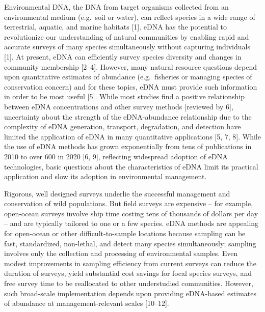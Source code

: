 \documentclass[
]{article}
\begin{document}
Environmental DNA, the DNA from target organisms collected from an
environmental medium (e.g.~soil or water), can reflect species in a wide
range of terrestrial, aquatic, and marine habitats {[}1{]}. eDNA has the
potential to revolutionize our understanding of natural communities by
enabling rapid and accurate surveys of many species simultaneously
without capturing individuals {[}1{]}. At present, eDNA can efficiently
survey species diversity and changes in community membership {[}2--4{]}.
However, many natural resource questions depend upon quantitative estimates
of abundance (e.g.~fisheries or managing species of conservation
concern) and for these topics, eDNA must provide such information
in order to be most useful {[}5{]}. While most studies find a
positive relationship between eDNA concentrations and other survey
methods {[}reviewed by 6{]}, uncertainty about the strength of the
eDNA-abundance relationship due to the complexity of eDNA generation,
transport, degradation, and detection have limited the application of
eDNA in many quantitative applications {[}5, 7, 8{]}. While the use of eDNA
methods has grown exponentially from tens of publications in 2010 to
over 600 in 2020 {[}6, 9{]}, reflecting widespread adoption of eDNA
technologies, basic questions about the characteristics of eDNA limit its
practical application and slow its adoption in environmental management.

Rigorous, well designed surveys underlie the successful management and
conservation of wild populations. But field surveys are expensive -- for
example, open-ocean surveys involve ship time costing tens of thousands
of dollars per day -- and are typically tailored to one or a few
species. eDNA methods are appealing for open-ocean or other
difficult-to-sample locations because sampling can be fast,
standardized, non-lethal, and detect many species simultaneously; sampling
involves only the collection and processing of environmental samples.
Even modest improvements in sampling efficiency from current surveys can
reduce the duration of surveys, yield substantial cost savings for focal
species surveys, and free survey time to be reallocated to other
understudied communities. However, such broad-scale implementation
depends upon providing eDNA-based estimates of abundance at
management-relevant scales {[}10--12{]}.
\end{document}
